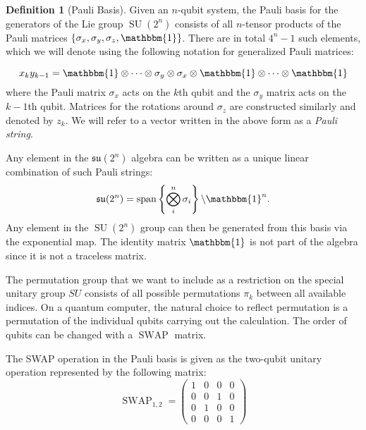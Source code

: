 \documentclass[%
 reprint,
 amsmath,amssymb,
 aps,
]{revtex4-2}
\newcommand{\SWAP}{\operatorname{SWAP}}
\theoremstyle{definition}%
\newtheorem{definition}{Definition}[section]
\begin{document}
\begin{definition}[Pauli Basis]
Given an $n$-qubit system, the Pauli basis for the generators of the Lie group $\operatorname{SU}(2^n)$ consists of all $n$-tensor products of the Pauli matrices $\{\sigma_x,\sigma_y,\sigma_z, \mathbbm{1}\}$. There are in total $4^n-1$ such elements, which we will denote using the following notation for generalized Pauli matrices:

\begin{equation}	x_k y_{k-1}=\mathbbm{1}\otimes\cdots\otimes\sigma_y \otimes\sigma_x\otimes\mathbbm{1}\otimes\cdots\otimes\mathbbm{1}
\label{eq:notation}
\end{equation}
where the Pauli matrix $\sigma_x$ acts on the $k$th qubit and the $\sigma_y$ matrix acts on the $k-1$th qubit. Matrices for the rotations around $\sigma_z$ are constructed similarly and denoted by $z_k$. We will refer to a vector written in the above form as a \textit{Pauli string}.
\end{definition}

Any element in the $\mathfrak{su}(2^n)$ algebra can be written as a unique linear combination of such Pauli strings:
\begin{equation}
\mathfrak{su}(2^n) = \operatorname{span}\left\{ \bigotimes_i^n \sigma_i\right\}\backslash \mathbbm{1}^n.
\end{equation}
Any element in the $\operatorname{SU}(2^n)$ group can then be generated from this basis via the exponential map. The identity matrix $\mathbbm{1}$ is not part of the algebra since it is not a traceless matrix. 

The permutation group that we want to include as a restriction on the special unitary group $SU$ consists of all possible permutations $\pi_k$ between all available indices. On a quantum computer, the natural choice to reflect permutation is a permutation of the individual qubits carrying out the calculation. The order of qubits can be changed with a $\SWAP$ matrix.

The SWAP operation in the Pauli basis is given as the two-qubit unitary operation represented by the following matrix:
\begin{equation}
\SWAP_{1,2} =
    \begin{pmatrix}
        1 & 0 & 0 & 0\\
        0 & 0 & 1 & 0\\
        0 & 1 & 0 & 0\\
        0 & 0 & 0 & 1
    \end{pmatrix}
\end{equation}
\end{document}
